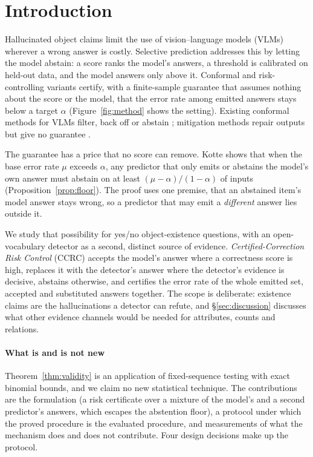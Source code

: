 \section{Introduction}
\label{sec:intro}

Hallucinated object claims limit the use of vision--language models (VLMs) wherever a wrong answer is costly. Selective prediction
addresses this by letting the model abstain: a score ranks the model's answers, a threshold is calibrated on held-out data, and the model
answers only above it. Conformal and risk-controlling variants \citep{bates2021rcps,angelopoulos2021ltt,angelopoulos2024crc} certify, with
a finite-sample guarantee that assumes nothing about the score or the model, that the error rate among emitted answers stays below a
target $\alpha$ (Figure~\ref{fig:method} shows the setting). Existing conformal methods for VLMs filter, back off or abstain
\citep{conflvlm,bcea,atabuzzaman2026introconformal}; mitigation methods repair outputs but give no guarantee
\citep{woodpecker,lure,reverse,cmvkgguard}.

The guarantee has a price that no score can remove. Kotte \citep{crcimposs} shows that when the base error rate $\mu$ exceeds $\alpha$, any
predictor that only emits or abstains the model's own answer must abstain on at least $(\mu-\alpha)/(1-\alpha)$ of inputs
(Proposition~\ref{prop:floor}). The proof uses one premise, that an abstained item's model answer stays wrong, so a predictor that may
emit a \emph{different} answer lies outside it.

We study that possibility for yes/no object-existence questions, with an open-vocabulary detector as a second, distinct source of evidence.
\emph{Certified-Correction Risk Control} (CCRC) accepts the model's answer where a correctness score is high, replaces it with the
detector's answer where the detector's evidence is decisive, abstains otherwise, and certifies the error rate of the whole emitted set,
accepted and substituted answers together. The scope is deliberate: existence claims are the hallucinations a detector can refute, and
\S\ref{sec:discussion} discusses what other evidence channels would be needed for attributes, counts and relations.

\paragraph{What is and is not new}
Theorem~\ref{thm:validity} is an application of fixed-sequence testing \citep{angelopoulos2021ltt} with exact binomial bounds, and we claim no new
statistical technique. The contributions are the formulation (a risk certificate over a mixture of the model's and a second predictor's
answers, which escapes the abstention floor), a protocol under which the proved procedure is the evaluated procedure, and measurements of what the
mechanism does and does not contribute. Four design decisions make up the protocol.

